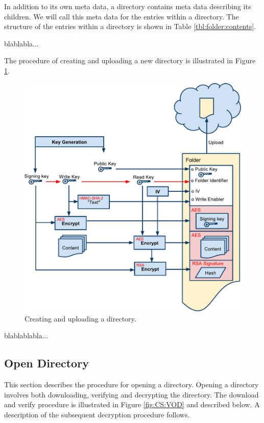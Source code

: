 \documentclass[pdftex,english,10pt,b5paper,twoside]{book}
\begin{document}
In addition to its own meta data, a directory contains meta data describing its
children. We will call this meta data for the entries within a directory. The
structure of the entries within a directory is shown in Table \ref{tbl:folder:contents}.



blablabla...

The procedure of creating and uploading a new directory is illustrated in Figure
\ref{fig:CS:CD}.

\begin{figure}[h!]
    \centering
        \includegraphics[width=\columnwidth]{CryptoCreateFolder.pdf}
	    \caption{Creating and uploading a directory.}
    \label{fig:CS:CD}
\end{figure}

blablablabla...

\subsection{Open Directory}

This section describes the procedure for opening a directory. Opening a
directory involves both downloading, verifying and decrypting the directory. The
download and verify procedure is illustrated in Figure \ref{fig:CS:VOD} and
described below. A description of the subsequent decryption procedure follows.
\end{document}
